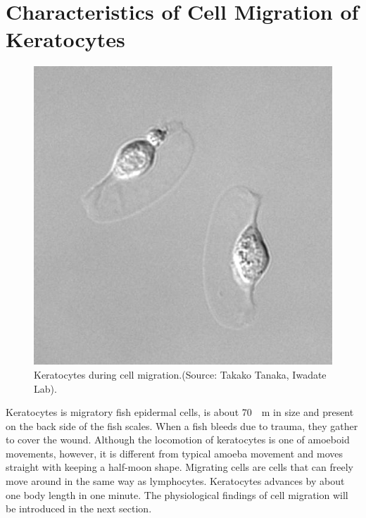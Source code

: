 \documentclass[a4paper,12pt]{book}
\begin{document}
\section{Characteristics of Cell Migration of Keratocytes}
\begin{figure}[tbp]
\centering
\includegraphics[scale=0.4]{kera.eps}
\caption{Keratocytes during cell migration.(Source: Takako Tanaka, Iwadate Lab).}
\label{fig:kera}
\end{figure}

Keratocytes is migratory fish epidermal cells, is about \SI{70}{\mu m} in size and present on the back side of the fish scales.
When a fish bleeds due to trauma, they gather to cover the wound.
Although the locomotion of keratocytes is one of amoeboid movements, however, it is different from typical amoeba movement and moves straight with keeping a half-moon shape.
Migrating cells are cells that can freely move around in the same way as lymphocytes.
Keratocytes advances by about one body length in one minute.
The physiological findings of cell migration will be introduced in the next section.
\end{document}
